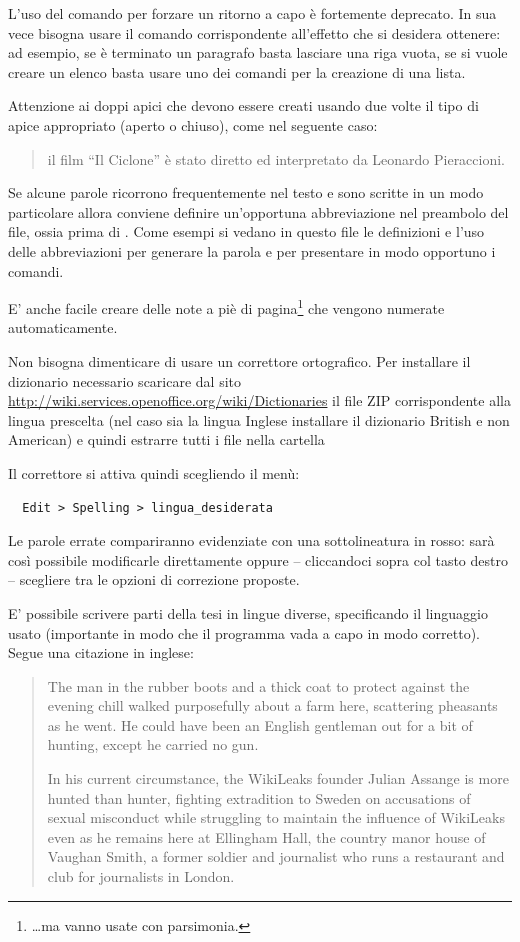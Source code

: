 L'uso del comando \cmd{\bs\bs} per forzare un ritorno a capo è fortemente deprecato. In sua vece bisogna usare il comando corrispondente all'effetto che si desidera ottenere: ad esempio, se è terminato un paragrafo basta lasciare una riga vuota, se si vuole creare un elenco basta usare uno dei comandi per la creazione di una lista.

Attenzione ai doppi apici  che devono essere creati usando due volte il tipo di apice appropriato (aperto o chiuso), come nel seguente caso:
\begin{quote}
il film ``Il Ciclone'' è stato diretto ed interpretato da Leonardo Pieraccioni.
\end{quote}
Se alcune parole ricorrono frequentemente nel testo e sono scritte in un modo particolare allora conviene definire un'opportuna abbreviazione nel preambolo del file, ossia prima di . Come esempi si vedano in questo file le definizioni e l'uso delle abbreviazioni  per generare la parola \ltx e  per presentare in modo opportuno i comandi.

E' anche facile creare delle note a piè di pagina\footnote{\ldots ma vanno usate con parsimonia.} che vengono numerate automaticamente.

Non bisogna dimenticare di usare un correttore ortografico. Per installare il dizionario necessario scaricare dal sito \url{http://wiki.services.openoffice.org/wiki/Dictionaries} il file ZIP corrispondente alla lingua prescelta (nel caso sia la lingua Inglese installare il dizionario British e non American) e quindi estrarre tutti i file nella  cartella
\begin{center}
\end{center}
Il correttore si attiva quindi scegliendo il menù:
\begin{verbatim}
  Edit > Spelling > lingua_desiderata
\end{verbatim}
Le parole errate compariranno evidenziate con una sottolineatura in rosso: sarà così possibile modificarle direttamente oppure -- cliccandoci sopra col tasto destro -- scegliere tra le opzioni di correzione proposte.

E' possibile scrivere parti della tesi in lingue diverse, specificando il linguaggio usato (importante in modo che il programma vada a capo in modo corretto). Segue una citazione in inglese:

\begin{quotation}
The man in the rubber boots and a thick coat to protect against the evening chill walked purposefully about a farm here, scattering pheasants as he went. He could have been an English gentleman out for a bit of hunting, except he carried no gun.

In his current circumstance, the WikiLeaks founder Julian Assange is more hunted than hunter, fighting extradition to Sweden on accusations of sexual misconduct while struggling to maintain the influence of WikiLeaks even as he remains here at Ellingham Hall, the country manor house of Vaughan Smith, a former soldier and journalist who runs a restaurant and club for journalists in London. 
\end{quotation}

